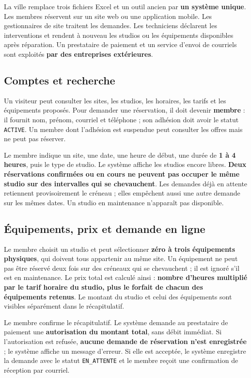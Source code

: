 \documentclass[10pt,a4paper]{article}
\begin{document}
La ville remplace trois fichiers Excel et un outil ancien par \textbf{un système unique}. Les membres réservent sur un site web ou une application mobile. Les gestionnaires de site traitent les demandes. Les techniciens déclarent les interventions et rendent à nouveau les studios ou les équipements disponibles après réparation. Un prestataire de paiement et un service d'envoi de courriels sont exploités \textbf{par des entreprises extérieures}.

\subsection{Comptes et recherche}
Un visiteur peut consulter les sites, les studios, les horaires, les tarifs et les équipements proposés. Pour demander une réservation, il doit devenir \textbf{membre} : il fournit nom, prénom, courriel et téléphone ; son adhésion doit avoir le statut \texttt{ACTIVE}. Un membre dont l'adhésion est suspendue peut consulter les offres mais ne peut pas réserver.

Le membre indique un site, une date, une heure de début, une durée de \textbf{1 à 4 heures}, puis le type de studio. Le système affiche les studios encore libres. \textbf{Deux réservations confirmées ou en cours ne peuvent pas occuper le même studio sur des intervalles qui se chevauchent}. Les demandes déjà en attente retiennent provisoirement le créneau ; elles empêchent aussi une autre demande sur les mêmes dates. Un studio en maintenance n'apparaît pas disponible.

\subsection{Équipements, prix et demande en ligne}
Le membre choisit un studio et peut sélectionner \textbf{zéro à trois équipements physiques}, qui doivent tous appartenir au même site. Un équipement ne peut pas être réservé deux fois sur des créneaux qui se chevauchent ; il est ignoré s'il est en maintenance. Le prix total est calculé ainsi : \textbf{nombre d'heures multiplié par le tarif horaire du studio, plus le forfait de chacun des équipements retenus}. Le montant du studio et celui des équipements sont visibles séparément dans le récapitulatif.

Le membre confirme le récapitulatif. Le système demande au prestataire de paiement une \textbf{autorisation du montant total}, sans débit immédiat. Si l'autorisation est refusée, \textbf{aucune demande de réservation n'est enregistrée} ; le système affiche un message d'erreur. Si elle est acceptée, le système enregistre la demande avec le statut \texttt{EN\_ATTENTE} et le membre reçoit une confirmation de réception par courriel.
\end{document}
